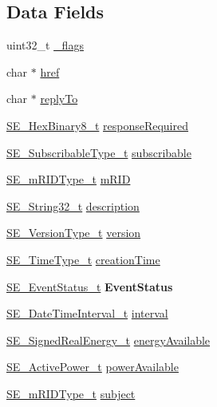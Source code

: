 \subsection*{Data Fields}
\begin{DoxyCompactItemize}
\item 
uint32\+\_\+t \hyperlink{group__FlowReservationResponse_ga84d53e405769d4e812dca9f816988bce}{\+\_\+flags}
\item 
char $\ast$ \hyperlink{group__FlowReservationResponse_gadc31242beb269a2a28b4fca3f45b38fb}{href}
\item 
char $\ast$ \hyperlink{group__FlowReservationResponse_gabfe55ba24b153e9af989100544c73a0c}{reply\+To}
\item 
\hyperlink{group__HexBinary8_gaecf2dab3615fb954a693c017a61f77d6}{S\+E\+\_\+\+Hex\+Binary8\+\_\+t} \hyperlink{group__FlowReservationResponse_gab718a8c77c27f3cef17dc8815a015901}{response\+Required}
\item 
\hyperlink{group__SubscribableType_ga5c41f553d369710ed34619266bf2551e}{S\+E\+\_\+\+Subscribable\+Type\+\_\+t} \hyperlink{group__FlowReservationResponse_ga94f00e1c91f5d76b177e210db546cf6b}{subscribable}
\item 
\hyperlink{group__mRIDType_gac74622112f3a388a2851b2289963ba5e}{S\+E\+\_\+m\+R\+I\+D\+Type\+\_\+t} \hyperlink{group__FlowReservationResponse_ga6559f6f39d1165b71e60144040d86f3e}{m\+R\+ID}
\item 
\hyperlink{group__String32_gac9f59b06b168b4d2e0d45ed41699af42}{S\+E\+\_\+\+String32\+\_\+t} \hyperlink{group__FlowReservationResponse_ga93ab9fa4728aabe9cf9de0a1ce61f9ca}{description}
\item 
\hyperlink{group__VersionType_ga4b8d27838226948397ed99f67d46e2ae}{S\+E\+\_\+\+Version\+Type\+\_\+t} \hyperlink{group__FlowReservationResponse_ga4749b6c0f5dbe4bf63f7d62b2e0c698d}{version}
\item 
\hyperlink{group__TimeType_ga6fba87a5b57829b4ff3f0e7638156682}{S\+E\+\_\+\+Time\+Type\+\_\+t} \hyperlink{group__FlowReservationResponse_ga79b81cc7eecfbcbe052af729a5342dd5}{creation\+Time}
\item 
\hyperlink{structSE__EventStatus__t}{S\+E\+\_\+\+Event\+Status\+\_\+t} {\bfseries Event\+Status}
\item 
\hyperlink{structSE__DateTimeInterval__t}{S\+E\+\_\+\+Date\+Time\+Interval\+\_\+t} \hyperlink{group__FlowReservationResponse_gaafbea15eb46c96dc2974f9115d80ade2}{interval}
\item 
\hyperlink{structSE__SignedRealEnergy__t}{S\+E\+\_\+\+Signed\+Real\+Energy\+\_\+t} \hyperlink{group__FlowReservationResponse_gabaac9e778afebc6169fa38de9a1b476c}{energy\+Available}
\item 
\hyperlink{structSE__ActivePower__t}{S\+E\+\_\+\+Active\+Power\+\_\+t} \hyperlink{group__FlowReservationResponse_gaf4730941a5e6075d599eeb5173d5cd1e}{power\+Available}
\item 
\hyperlink{group__mRIDType_gac74622112f3a388a2851b2289963ba5e}{S\+E\+\_\+m\+R\+I\+D\+Type\+\_\+t} \hyperlink{group__FlowReservationResponse_gabbd0fa2ff3f086063ddf07aa555b0183}{subject}
\end{DoxyCompactItemize}


